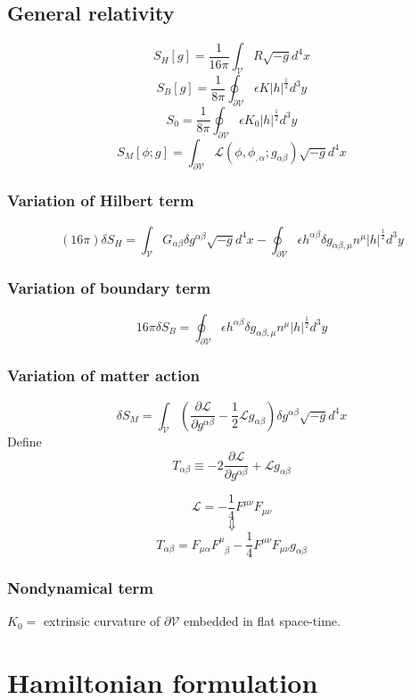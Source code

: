 \subsection{General relativity}
\[S_{H}[g] = \frac{1}{16\pi} \int_{\mathcal{V}} R \sqrt{-g} d^4 x\]
\[S_{B}[g] = \frac{1}{8 \pi} \oint_{\partial \mathcal{V}} \epsilon K |h|^{\frac{1}{2}} d^3 y\]
\[S_0 = \frac{1}{8\pi} \oint_{\partial \mathcal{V}} \epsilon K_0 |h|^{\frac{1}{2}} d^3 y\]
\[S_M[\phi;g] = \int_{\partial \mathcal{V}} \mathcal{L}(\phi,\phi_{,\alpha};g_{\alpha \beta}) \sqrt{-g} d^4 x\]
\subsubsection{Variation of Hilbert term}
\[(16 \pi) \delta S_H = \int_{\mathcal{V}} G_{\alpha \beta} \delta g^{\alpha \beta} \sqrt{-g} d^4 x - \oint_{\partial \mathcal{V}} \epsilon h^{\alpha \beta} \delta g_{\alpha \beta, \mu} n^{\mu} |h|^{\frac{1}{2}} d^3 y\]
\subsubsection{Variation of boundary term}
\[16\pi \delta S_B = \oint_{\partial \mathcal{V}} \epsilon h^{\alpha \beta} \delta g_{\alpha \beta, \mu} n^{\mu} |h|^{\frac{1}{2}} d^3 y \]
\subsubsection{Variation of matter action}
\[\delta S_M = \int_{\mathcal{V}} \left( \frac{\partial \mathcal{L}}{\partial g^{\alpha \beta}} - \frac{1}{2} \mathcal{L} g_{\alpha \beta} \right) \delta g^{\alpha \beta} \sqrt{-g} d^4 x\]
Define
\[T_{\alpha \beta} \equiv -2 \frac{\partial \mathcal{L}}{\partial g^{\alpha \beta}} + \mathcal{L} g_{\alpha \beta}\]
\begin{example}
\[\mathcal{L} = -\frac{1}{4} F^{\mu \nu}F_{\mu \nu}\]
\[\Downarrow\]
\[T_{\alpha \beta} = F_{\mu \alpha} F^{\mu}_{\phantom{\mu} \beta} - \frac{1}{4} F^{\mu \nu} F_{\mu \nu} g_{\alpha \beta}\]
\end{example}
\subsubsection{Nondynamical term}
$K_0 = $ extrinsic curvature of $\partial \mathcal{V}$ embedded in flat space-time.

\section{Hamiltonian formulation}
